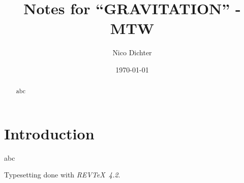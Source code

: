 \documentclass[%
reprint,
amsmath,amssymb,
aps,
pra,
floatfix,
]{revtex4-2}
\begin{document}
	\title{Notes for \enquote{GRAVITATION} - MTW}
	
	\author{Nico Dichter}
	
	
	\date{\today}
	
	\begin{abstract}
		abc
	\end{abstract}
	
	\maketitle
	
	\section{Introduction}\label{sec:introduction}
	abc
	
	
	
	
	
	\begin{acknowledgments}
		Typesetting done with \emph{REV\TeX\ 4.2}.
	\end{acknowledgments}
	
	
	
	
	
	
	
\end{document}
